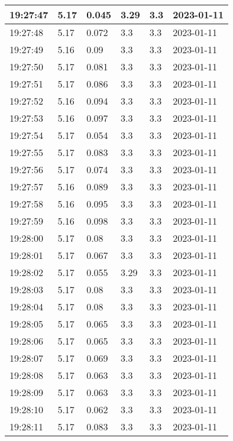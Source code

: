 \begin{longtable}{|l|l|l|l|l|l|}
        19:27:47 & 5.17 & 0.045 & 3.29 & 3.3 & 2023-01-11 \\ \hline
        19:27:48 & 5.17 & 0.072 & 3.3 & 3.3 & 2023-01-11 \\ \hline
        19:27:49 & 5.16 & 0.09 & 3.3 & 3.3 & 2023-01-11 \\ \hline
        19:27:50 & 5.17 & 0.081 & 3.3 & 3.3 & 2023-01-11 \\ \hline
        19:27:51 & 5.17 & 0.086 & 3.3 & 3.3 & 2023-01-11 \\ \hline
        19:27:52 & 5.16 & 0.094 & 3.3 & 3.3 & 2023-01-11 \\ \hline
        19:27:53 & 5.16 & 0.097 & 3.3 & 3.3 & 2023-01-11 \\ \hline
        19:27:54 & 5.17 & 0.054 & 3.3 & 3.3 & 2023-01-11 \\ \hline
        19:27:55 & 5.17 & 0.083 & 3.3 & 3.3 & 2023-01-11 \\ \hline
        19:27:56 & 5.17 & 0.074 & 3.3 & 3.3 & 2023-01-11 \\ \hline
        19:27:57 & 5.16 & 0.089 & 3.3 & 3.3 & 2023-01-11 \\ \hline
        19:27:58 & 5.16 & 0.095 & 3.3 & 3.3 & 2023-01-11 \\ \hline
        19:27:59 & 5.16 & 0.098 & 3.3 & 3.3 & 2023-01-11 \\ \hline
        19:28:00 & 5.17 & 0.08 & 3.3 & 3.3 & 2023-01-11 \\ \hline
        19:28:01 & 5.17 & 0.067 & 3.3 & 3.3 & 2023-01-11 \\ \hline
        19:28:02 & 5.17 & 0.055 & 3.29 & 3.3 & 2023-01-11 \\ \hline
        19:28:03 & 5.17 & 0.08 & 3.3 & 3.3 & 2023-01-11 \\ \hline
        19:28:04 & 5.17 & 0.08 & 3.3 & 3.3 & 2023-01-11 \\ \hline
        19:28:05 & 5.17 & 0.065 & 3.3 & 3.3 & 2023-01-11 \\ \hline
        19:28:06 & 5.17 & 0.065 & 3.3 & 3.3 & 2023-01-11 \\ \hline
        19:28:07 & 5.17 & 0.069 & 3.3 & 3.3 & 2023-01-11 \\ \hline
        19:28:08 & 5.17 & 0.063 & 3.3 & 3.3 & 2023-01-11 \\ \hline
        19:28:09 & 5.17 & 0.063 & 3.3 & 3.3 & 2023-01-11 \\ \hline
        19:28:10 & 5.17 & 0.062 & 3.3 & 3.3 & 2023-01-11 \\ \hline
        19:28:11 & 5.17 & 0.083 & 3.3 & 3.3 & 2023-01-11 \\ \hline

\end{longtable}
